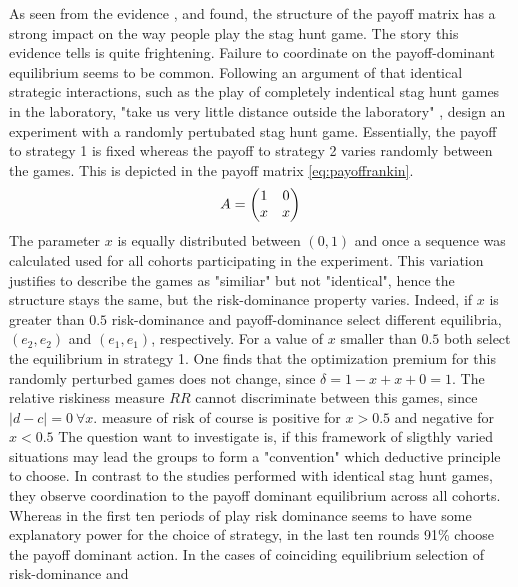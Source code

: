 \documentclass[11pt]{article}
\begin{document}
As seen from the evidence \textcite{battalio_optimization_2001},
\textcite{schmidt_playing_2003} and \textcite{dubois_optimization_2012} 
found, the structure of the payoff matrix has a strong impact on the way 
people play the stag hunt game.   
The story this evidence tells is quite frightening. Failure to coordinate 
on the payoff-dominant equilibrium seems to be common. 
Following an argument of \textcite{kreps_game_1990} that identical strategic 
interactions, such as the play of completely indentical stag hunt games 
in the laboratory, "take us very little distance outside the laboratory" 
\parencite[212]{kreps_game_1990}, 
\textcite{rankin_strategic_2000} design an experiment with a randomly 
pertubated stag hunt game. Essentially, the payoff to strategy 1 is fixed 
whereas the payoff to strategy 2 varies randomly between the games. This is
depicted in the payoff matrix \eqref{eq:payoffrankin}.
\begin{align}
        \label{eq:payoffrankin}
        A = \mqty(1 & 0 \\ x & x)
\end{align}        
The parameter $x$ is equally distributed between $(0,1)$ and once a sequence
was calculated used for all cohorts participating in the experiment. This
variation justifies to describe the games as "similiar" but not
"identical", hence the structure stays the same, but the risk-dominance 
property varies. Indeed, if $x$ is greater than $0.5$ risk-dominance and
payoff-dominance select different equilibria, $(e_2,e_2)$ and $(e_1,e_1)$,
respectively. For a value of $x$ smaller than $0.5$ both select 
the equilibrium in strategy 1. One finds that the optimization premium for 
this randomly perturbed games does not change, since $\delta=1-x+x+0=1$. 
The relative riskiness measure $RR$ cannot discriminate between this games,
since $|d-c|=0\ \forall x$. \cite{schmidt_playing_2003} measure of risk of 
course is positive for $x > 0.5$ and negative for $x <0.5$
The question \textcite{rankin_strategic_2000}
want to investigate is, if this framework of sligthly varied situations may
lead the groups to form a "convention" which deductive principle to choose. 
In contrast to the studies performed with identical stag hunt games, they 
observe coordination to the payoff dominant equilibrium across
all cohorts. Whereas in the first ten periods of play risk dominance seems
to have some explanatory power for the choice of strategy, in the last ten
rounds 91\% choose the payoff dominant action. 
In the cases of coinciding equilibrium selection of risk-dominance and 
\end{document}
